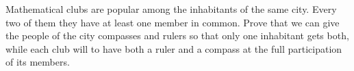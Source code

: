 Mathematical clubs are popular among the inhabitants of the same city. Every two of them they have at least one member in common. Prove that we can give the people of the city compasses and rulers so that only one inhabitant gets both, while each club will to have both a ruler and a compass at the full participation of its members.